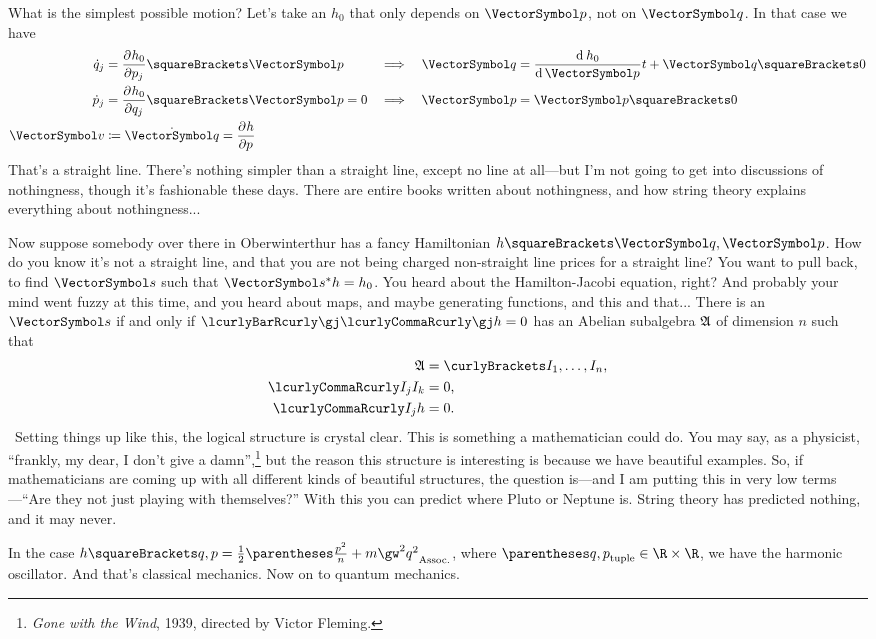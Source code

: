 \documentclass[10pt, a4paper, twoside]{lecturenotes}
\begin{document}
\begin{lecture}[date=2013-04-11]
What is the simplest possible motion? Let's take an $h_0$ that only depends on $\vp$, not on $\vq$. In that case we have
\begin{alignat*}{3}
\TimeDerivative q_j &= \pderiv{p_j}{h_0}\of\vp &\Implies&& \vq &= \deriv{\vp}{h_0}t + \vq\of{0} \\
\TimeDerivative p_j &= \pderiv{q_j}{h_0}\of\vp = 0 &\Implies && \vp &= \vp\of{0} \\
\vv &\DefineAs \TimeDerivative \vq = \pderiv p h
\end{alignat*}
That's a straight line. There's nothing simpler than a straight line, except no line at all---but I'm not going to get into discussions of nothingness, though it's fashionable these days. There are entire books written about nothingness, and how string theory explains everything about nothingness...

Now suppose somebody over there in Oberwinterthur has a fancy Hamiltonian $h\of{\vq,\vp}$. How do you know it's not a straight line, and that you are not being charged non-straight line prices for a straight line? You want to pull back, to find $\vs$ such that $\Pullback \vs h = h_0$. You heard about the Hamilton-Jacobi equation, right? And probably your mind went fuzzy at this time, and you heard about maps, and maybe generating functions, and this and that... 
There is an $\vs$ if and only if $\setst{\gj}{\Poisson\gj h = 0}$ has an Abelian subalgebra $\mathfrak{A}$ of dimension $n$ such that
\begin{align*}
\LieAlgebraSymbol A &= \set{I_1,\dotsc,I_n}\text, \\
\Poisson{I_j}{I_k}&= 0\text,\\
\Poisson{I_j}{h}&=0\text.
\end{align*}
\
Setting things up like this, the logical structure is crystal clear. This is something a mathematician could do. You may say, as a physicist, ``frankly, my dear, I don't give a damn'',\footnote{\emph{Gone with the Wind}, 1939, directed by Victor Fleming.} but the reason this structure is interesting is because we have beautiful examples. So, if mathematicians are coming up with all different kinds of beautiful structures, the question is---and I am putting this in very low terms---``Are they not just playing with themselves?'' With this you can predict where Pluto or Neptune is. String theory has predicted nothing, and it may never.

In the case $h\of{q,p}=\frac{1}{2}\pa{\frac{p^2}{n} + m\gw^2 q^2}$, where $\tuple{q,p}\in\R\Cartesian\R$, we have the harmonic oscillator.
And that's classical mechanics. Now on to quantum mechanics.


\end{lecture}
\end{document}
